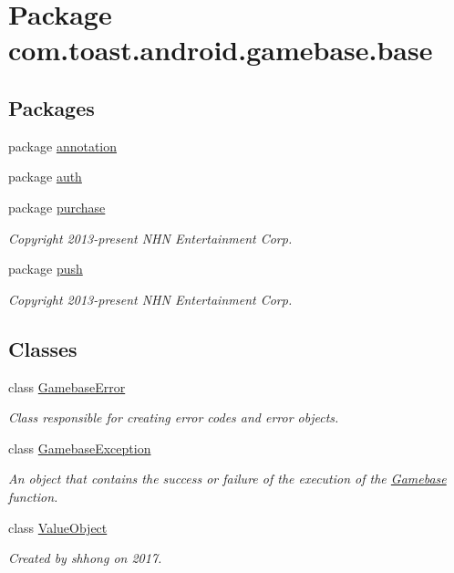 \hypertarget{namespacecom_1_1toast_1_1android_1_1gamebase_1_1base}{}\section{Package com.\+toast.\+android.\+gamebase.\+base}
\label{namespacecom_1_1toast_1_1android_1_1gamebase_1_1base}
\subsection*{Packages}
\begin{DoxyCompactItemize}
\item 
package \hyperlink{namespacecom_1_1toast_1_1android_1_1gamebase_1_1base_1_1annotation}{annotation}
\item 
package \hyperlink{namespacecom_1_1toast_1_1android_1_1gamebase_1_1base_1_1auth}{auth}
\item 
package \hyperlink{namespacecom_1_1toast_1_1android_1_1gamebase_1_1base_1_1purchase}{purchase}
\begin{DoxyCompactList}\small\item\em Copyright 2013-\/present N\+HN Entertainment Corp. \end{DoxyCompactList}\item 
package \hyperlink{namespacecom_1_1toast_1_1android_1_1gamebase_1_1base_1_1push}{push}
\begin{DoxyCompactList}\small\item\em Copyright 2013-\/present N\+HN Entertainment Corp. \end{DoxyCompactList}\end{DoxyCompactItemize}
\subsection*{Classes}
\begin{DoxyCompactItemize}
\item 
class \hyperlink{classcom_1_1toast_1_1android_1_1gamebase_1_1base_1_1_gamebase_error}{Gamebase\+Error}
\begin{DoxyCompactList}\small\item\em Class responsible for creating error codes and error objects. \end{DoxyCompactList}\item 
class \hyperlink{classcom_1_1toast_1_1android_1_1gamebase_1_1base_1_1_gamebase_exception}{Gamebase\+Exception}
\begin{DoxyCompactList}\small\item\em An object that contains the success or failure of the execution of the \hyperlink{classcom_1_1toast_1_1android_1_1gamebase_1_1_gamebase}{Gamebase} function. \end{DoxyCompactList}\item 
class \hyperlink{classcom_1_1toast_1_1android_1_1gamebase_1_1base_1_1_value_object}{Value\+Object}
\begin{DoxyCompactList}\small\item\em Created by shhong on 2017. \end{DoxyCompactList}\end{DoxyCompactItemize}
